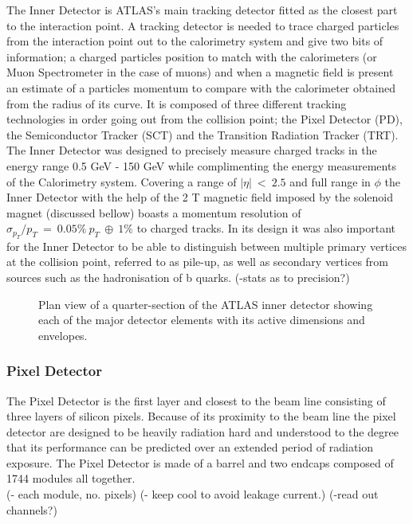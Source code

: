 		The Inner Detector is ATLAS's main tracking detector fitted as the closest part to the interaction point. A tracking detector is needed to trace charged particles from the interaction point out to the calorimetry system and give two bits of information; a charged particles position to match with the calorimeters (or Muon Spectrometer in the case of muons) and when a magnetic field is present an estimate of a particles momentum to compare with the calorimeter obtained from the radius of its curve. It is composed of three different tracking technologies in order going out from the collision point; the Pixel Detector (PD), the Semiconductor Tracker (SCT) and the Transition Radiation Tracker (TRT). The Inner Detector was designed to precisely measure charged tracks in the energy range 0.5 GeV - 150 GeV while complimenting the energy measurements of the Calorimetry system. Covering a range of $|\eta|~<~2.5$ and full range in $\phi$ the Inner Detector with the help of the 2 T magnetic field imposed by the solenoid magnet (discussed bellow) boasts a momentum resolution of $\sigma_{p_{T}}/p_{T}~=~0.05\%~p_{T}~\oplus~1\%$ to charged tracks. In its design it was also important for the Inner Detector to be able to distinguish between multiple primary vertices at the collision point, referred to as pile-up, as well as secondary vertices from sources such as the hadronisation of b quarks. 
		(-stats as to precision?)

		\begin{figure}[h]
			\begin{center}
			\end{center}
			\caption{Plan view of a quarter-section of the ATLAS inner detector showing each of the major
detector elements with its active dimensions and envelopes.}
			\label{fig:ATLAS_inner_config}
		\end{figure}



		\subsubsection*{Pixel Detector} 

		The Pixel Detector is the first layer and closest to the beam line consisting of three layers of silicon pixels. Because of its proximity to the beam line the pixel detector are designed to be heavily radiation hard and understood to the degree that its performance can be predicted over an extended period of radiation exposure. The Pixel Detector is made of a barrel and two endcaps composed of 1744 modules all together. \\
		(- each module, no. pixels)
		(- keep cool to avoid leakage current.)
		(-read out channels?)


